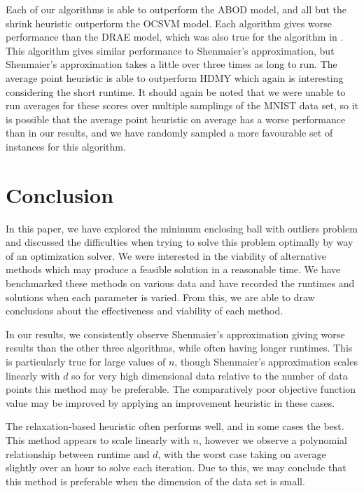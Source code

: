 \documentclass[11pt,twoside]{report}
\theoremstyle{definition}
\numberwithin{theorem}{section}
\numberwithin{definition}{section}
\numberwithin{lemma}{section}
\numberwithin{proposition}{section}
\numberwithin{equation}{section}
\numberwithin{figure}{section}
\begin{document}
Each of our algorithms is able to outperform the ABOD model, and all but the shrink heuristic outperform the OCSVM model. Each algorithm gives worse performance than the DRAE model, which was also true for the algorithm in \cite{huding}. This algorithm gives similar performance to Shenmaier's approximation, but Shenmaier's approximation takes a little over three times as long to run. The average point heuristic is able to outperform HDMY which again is interesting considering the short runtime. It should again be noted that we were unable to run averages for these scores over multiple samplings of the MNIST data set, so it is possible that the average point heuristic on average has a worse performance than in our results, and we have randomly sampled a more favourable set of instances for this algorithm.


\chapter{Conclusion}\label{conclusion}

In this paper, we have explored the minimum enclosing ball with outliers problem and discussed the difficulties when trying to solve this problem optimally by way of an optimization solver. We were interested in the viability of alternative methods which may produce a feasible solution in a reasonable time. We have benchmarked these methods on various data and have recorded the runtimes and solutions when each parameter is varied. From this, we are able to draw conclusions about the effectiveness and viability of each method.

In our results, we consistently observe Shenmaier's approximation giving worse results than the other three algorithms, while often having longer runtimes. This is particularly true for large values of $n$, though Shenmaier's approximation scales linearly with $d$ so for very high dimensional data relative to the number of data points this method may be preferable. The comparatively poor objective function value may be improved by applying an improvement heuristic in these cases.

The relaxation-based heuristic often performs well, and in some cases the best. This method appears to scale linearly with $n$, however we observe a polynomial relationship between runtime and $d$, with the worst case taking on average slightly over an hour to solve each iteration. Due to this, we may conclude that this method is preferable when the dimension of the data set is small.
\end{document}

